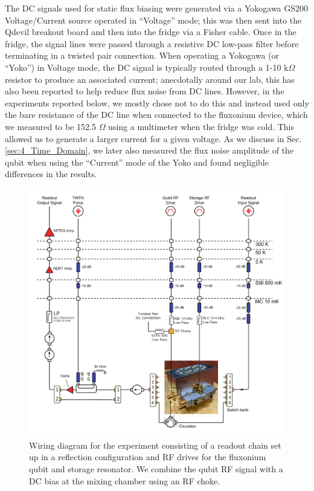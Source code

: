 The DC signals used for static flux biasing were generated via a Yokogawa GS200 Voltage/Current source operated in ``Voltage'' mode; this was then sent into the Qdevil breakout board and then into the fridge via a Fisher cable. Once in the fridge, the signal lines were passed through a resistive DC low-pass filter before terminating in a twisted pair connection. When operating a Yokogawa (or ``Yoko'') in Voltage mode, the DC signal is typically routed through a 1-10 k$\Omega$ resistor to produce an associated current; anecdotally around our lab, this has also been reported to help reduce flux noise from DC lines. However, in the experiments reported below, we mostly chose not to do this and instead used only the bare resistance of the DC line when connected to the fluxonium device, which we measured to be 152.5 $\Omega$ using a multimeter when the fridge was cold. This allowed us to generate a larger current for a given voltage. As we discuss in Sec. \ref{sec:4_Time_Domain}, we later also measured the flux noise amplitude of the qubit when using the ``Current'' mode of the Yoko and found negligible differences in the results. %

\begin{figure}[ht]
    \centering
    \includegraphics[width=\linewidth]{Figures/4/Microwave-Wiring-Diagram.pdf}
    \caption[Microwave wiring diagram for the experiment.]{Wiring diagram for the experiment consisting of a readout chain set up in a reflection configuration and RF drives for the fluxonium qubit and storage resonator. We combine the qubit RF signal with a DC bias at the mixing chamber using an RF choke.}
    \label{fig:4-microwave-wiring-diagram}
\end{figure}


